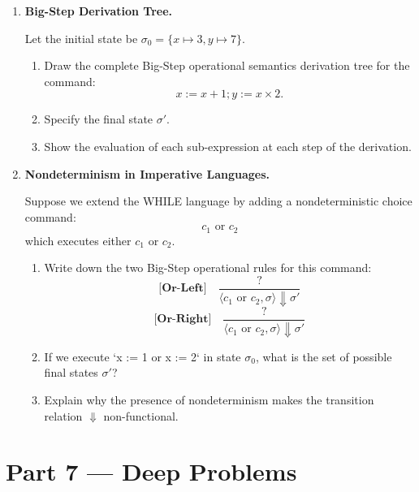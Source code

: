 \documentclass[12pt, a4paper]{book}
\begin{document}
\begin{problembox}
\begin{enumerate}[label=\textbf{P\arabic*.}]
  \item \textbf{Big-Step Derivation Tree.}
  
        Let the initial state be $\sigma_0 = \{x \mapsto 3, y \mapsto 7\}$.
        \begin{enumerate}[label=(\alph*)]
          \item Draw the complete Big-Step operational semantics derivation tree for the command:
                \[
                  x := x + 1 ; y := x \times 2.
                \]
          \item Specify the final state $\sigma'$.
          \item Show the evaluation of each sub-expression at each step of the derivation.
        \end{enumerate}

  \item \textbf{Nondeterminism in Imperative Languages.}
  
        Suppose we extend the WHILE language by adding a nondeterministic choice command:
        \[
          c_1 \text{ or } c_2
        \]
        which executes either $c_1$ or $c_2$.
        \begin{enumerate}[label=(\alph*)]
          \item Write down the two Big-Step operational rules for this command:
                \[
                  \textbf{[Or-Left]} \quad \frac{?}{\langle c_1 \text{ or } c_2, \sigma \rangle \Downarrow \sigma'}
                \]
                \[
                  \textbf{[Or-Right]} \quad \frac{?}{\langle c_1 \text{ or } c_2, \sigma \rangle \Downarrow \sigma'}
                \]
          \item If we execute `x := 1 or x := 2` in state $\sigma_0$, what is the set of possible final states $\sigma'$?
          \item Explain why the presence of nondeterminism makes the transition relation $\Downarrow$ non-functional.
        \end{enumerate}
\end{enumerate}
\end{problembox}

\newpage

\section{Part 7 --- Deep Problems}
\end{document}
